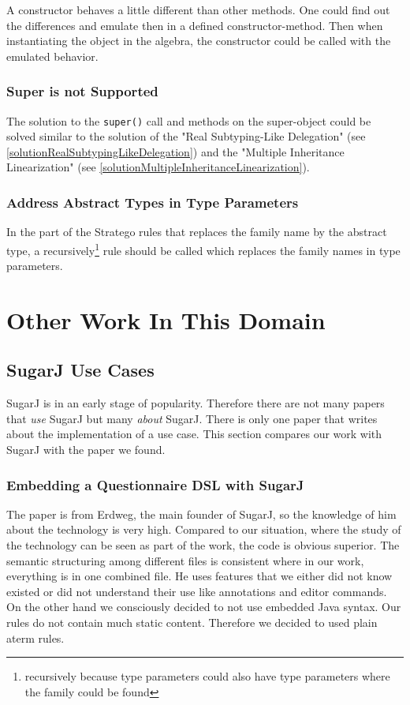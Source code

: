 \documentclass{report}
\begin{document}
A constructor behaves a little different than other methods. One could find out the differences and emulate then in a defined constructor-method. Then when instantiating the object in the algebra, the constructor could be called with the emulated behavior.

\subsection{Super is not Supported}

The solution to the \lstinline{super()} call and methods on the super-object could be solved similar to the solution of the "Real Subtyping-Like Delegation" (see \ref{solutionRealSubtypingLikeDelegation}) and the "Multiple Inheritance Linearization" (see \ref{solutionMultipleInheritanceLinearization}).

\subsection{Address Abstract Types in Type Parameters}

In the part of the Stratego rules that replaces the family name by the abstract type, a recursively\footnote{recursively because type parameters could also have type parameters where the family could be found} rule should be called which replaces the family names in type parameters.

\chapter{Other Work In This Domain}

\section{SugarJ \cite{Erdweg-SugarJ-2011} Use Cases}

SugarJ is in an early stage of popularity. Therefore there are not many papers that \emph{use} SugarJ but many \emph{about} SugarJ. There is only one paper that writes about the implementation of a use case. This section compares our work with SugarJ with the paper we found.

\subsection{Embedding a Questionnaire DSL with SugarJ \cite{Erdweg-Questionnaire-2013}}

The paper is from Erdweg, the main founder of SugarJ, so the knowledge of him about the technology is very high. Compared to our situation, where the study of the technology can be seen as part of the work, the code is obvious superior. The semantic structuring among different files is consistent where in our work, everything is in one combined file. He uses features that we either did not know existed or did not understand their use like annotations and editor commands. On the other hand we consciously decided to not use embedded Java syntax. Our rules do not contain much static content. Therefore we decided to used plain aterm rules.
\end{document}

